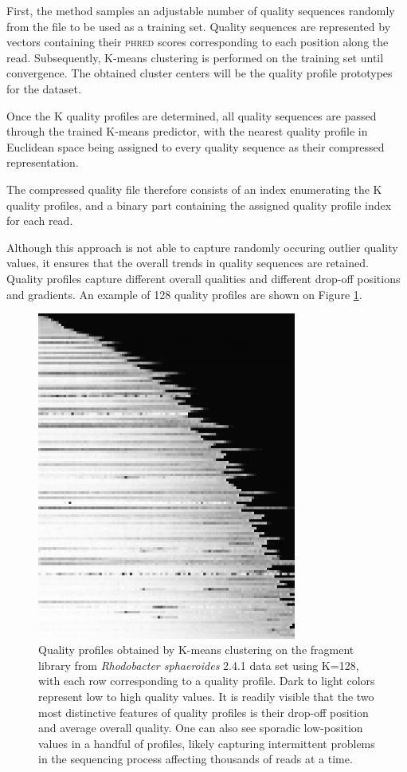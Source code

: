 \documentclass{bioinfo}
\begin{document}
\begin{methods}
First, the method samples an adjustable number of quality sequences randomly from the file to be used as a training set. Quality sequences are represented by vectors containing their \textsc{phred} scores corresponding to each position along the read. Subsequently, K-means clustering is performed on the training set until convergence. The obtained cluster centers will be the quality profile prototypes for the dataset.

Once the K quality profiles are determined, all quality sequences are passed through the trained K-means predictor, with the nearest quality profile in Euclidean space being assigned to every quality sequence as their compressed representation.

The compressed quality file therefore consists of an index enumerating the K quality profiles, and a binary part containing the assigned quality profile index for each read.

Although this approach is not able to capture randomly occuring outlier quality values, it ensures that the overall trends in quality sequences are retained. Quality profiles capture different overall qualities and different drop-off positions and gradients. An example of 128 quality profiles are shown on Figure \ref{fig:profiles_128}.

\begin{figure}[!tpb]%
\centerline{\includegraphics[width=3.35in]{profiles_128.png}}
\caption{Quality profiles obtained by K-means clustering on the fragment library from \textit{Rhodobacter sphaeroides} 2.4.1 data set using K=128, with each row corresponding to a quality profile. Dark to light colors represent low to high quality values. It is readily visible that the two most distinctive features of quality profiles is their drop-off position and average overall quality. One can also see sporadic low-position values in a handful of profiles, likely capturing intermittent problems in the sequencing process affecting thousands of reads at a time.}\label{fig:profiles_128}
\end{figure}



\end{methods}
\end{document}
